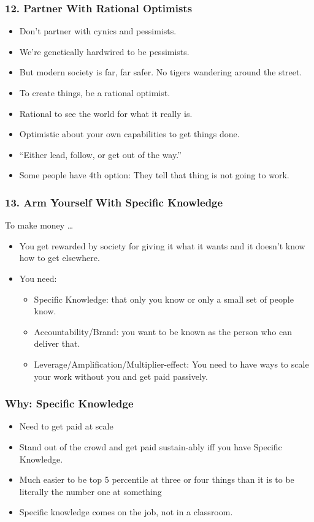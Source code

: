 \begin{frame}[fragile]
\frametitle{12. Partner With Rational Optimists}
\begin{itemize}
\item Don't partner with cynics and pessimists.
\item We're genetically hardwired to be pessimists. 
\item But modern society is far, far safer. No tigers wandering around the street.
\item To create things, be a rational optimist. 
\item Rational to see the world for what it really is. 
\item Optimistic about your own capabilities to get things done.
\item``Either lead, follow, or get out of the way.'' 
\item Some people have 4th option: They tell that thing is not going to work.
\end{itemize}
\end{frame}

\begin{frame}[fragile]
\frametitle{13. Arm Yourself With Specific Knowledge}
To make money \ldots
\begin{itemize}
\item You get rewarded by society for giving it what it wants and it doesn't know how to get elsewhere.
\item You need:
\begin{itemize}
\item Specific Knowledge: that only you know or only a small set of people know.
\item Accountability/Brand: you want to be known as the person who can deliver that.
\item Leverage/Amplification/Multiplier-effect: You need to have ways to scale your work without you and get paid passively.
\end{itemize}
\end{itemize}
\end{frame}

\begin{frame}[fragile]
\frametitle{Why: Specific Knowledge}
\begin{itemize}
\item Need to get paid at scale
\item Stand out of the crowd and get paid sustain-ably iff you have Specific Knowledge.
\item  Much easier to be top 5 percentile at three or four things than it is to be literally the number one at something
\item Specific knowledge comes on the job, not in a classroom.
\end{itemize}
\end{frame}

